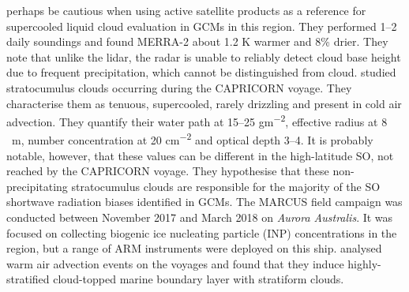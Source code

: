 perhaps be cautious when using active satellite
products as a reference for supercooled liquid cloud evaluation in GCMs
in this region. They performed 1--2 daily soundings and found MERRA-2 about
1.2 K warmer and 8\% drier. They note that unlike the lidar, the radar is unable
to reliably detect cloud base height due to frequent precipitation, which
cannot be distinguished from cloud.
\cite{mace2018b} studied stratocumulus clouds occurring during the CAPRICORN
voyage. They characterise them as tenuous, supercooled, rarely drizzling
and present in cold air advection. They quantify their water path at 15--25 \unit{gm^{-2}},
effective radius at 8 \unit{\mu m}, number concentration at 20 \unit{cm^{-2}} and optical
depth 3--4. It is probably notable, however, that these values can be different
in the high-latitude SO, not reached by the CAPRICORN voyage. They hypothesise
that these non-precipitating stratocumulus clouds are responsible for the majority
of the SO shortwave radiation biases identified in GCMs.
The MARCUS field campaign was conducted between November 2017 and March 2018
on \textit{Aurora Australis}. It was focused on collecting biogenic ice nucleating particle (INP) concentrations in the region,
but a range of ARM instruments were deployed on this ship.
\cite{zheng2019} analysed warm air advection events on the voyages and found
that they induce highly-stratified cloud-topped marine boundary layer with
stratiform clouds.

